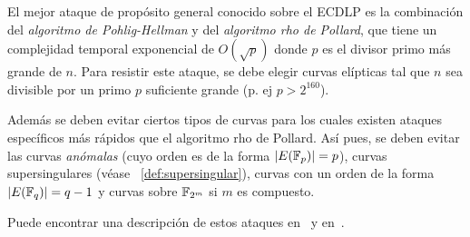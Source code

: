 El mejor ataque de propósito general conocido sobre el ECDLP es la combinación del \emph{algoritmo de Pohlig-Hellman} y del \emph{algoritmo rho de Pollard}, que tiene un complejidad temporal exponencial de $O(\sqrt{p})$ donde $p$ es el divisor primo más grande de $n$. Para resistir este ataque, se debe elegir curvas elípticas tal que $n$ sea divisible por un primo $p$ suficiente grande (p. ej $p > 2^{160}$).

Además se deben evitar ciertos tipos de curvas para los cuales existen ataques específicos más rápidos que el algoritmo rho de Pollard. Así pues, se deben evitar las curvas \emph{anómalas} (cuyo orden es de la forma $|E(\mathbb{F}_p)| = p$), curvas supersingulares (véase ~\ref{def:supersingular}), curvas con un orden de la forma $|E(\mathbb{F}_q)| = q - 1$ y curvas sobre $\mathbb{F}_{2^m}$ si $m$ es compuesto.

Puede encontrar una descripción de estos ataques en~\cite[cap. 4]{Hankerson:2003} y en~\cite[cap. 4]{Washington:2008}.

